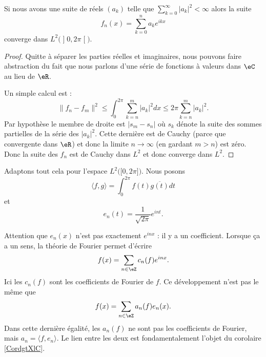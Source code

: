 \begin{proposition}
	Si nous avons une suite de réels \( (a_k)\) telle que \( \sum_{k=0}^{\infty}| a_k |^2<\infty\) alors la suite
	\begin{equation}
		f_n(x)=\sum_{k=0}^na_k e^{ikx}
	\end{equation}
	converge dans \( L^2\big( \mathopen] 0 , 2\pi \mathclose[ \big)\).
\end{proposition}

\begin{proof}
	Quitte à séparer les parties réelles et imaginaires, nous pouvons faire abstraction du fait que nous parlons d'une série de fonctions à valeurs dans \( \eC\) au lieu de \( \eR\).

	Un simple calcul est :
	\begin{equation}    \label{EqHVdJxZT}
		\| f_n-f_m \|^2\leq\int_0^{2\pi}\sum_{k=n}^m| a_k |^2dx\leq 2\pi\sum_{k=n}^m| a_k |^2.
	\end{equation}
	Par hypothèse le membre de droite est \( | s_m-s_n |\) où \( s_k\) dénote la suite des sommes partielles de la série des \( | a_k |^2\). Cette dernière est de Cauchy (parce que convergente dans \( \eR\)) et donc la limite \( n\to\infty\) (en gardant \( m>n\)) est zéro. Donc la suite des \( f_n\) est de Cauchy dans \( L^2\) et donc converge dans \( L^2\).
\end{proof}

\begin{normaltext}
	Adaptons tout cela pour l'espace \( L^2\big( \mathopen[ 0 , 2\pi \mathclose] \big)\). Nous posons
	\begin{equation}        \label{EQooBFKDooMkCZOt}
		\langle f, g\rangle =\int_0^{2\pi}f(t)\overline{ g(t) }dt
	\end{equation}
	et
	\begin{equation}        \label{EQooKMYOooLZCNap}
		e_n(t)=\frac{1}{ \sqrt{ 2\pi } } e^{int}.
	\end{equation}
\end{normaltext}

\begin{normaltext}
	Attention que \( e_n(x)\) n'est pas exactement \(  e^{inx}\) : il y a un coefficient. Lorsque ça a un sens, la théorie de Fourier permet d'écrire
	\begin{equation}
		f(x)=\sum_{n\in \eZ}c_n(f) e^{inx}.
	\end{equation}
	Ici les \( c_n(f)\) sont les coefficients de Fourier de \( f\). Ce développement n'est pas le même que
	\begin{equation}
		f(x)=\sum_{n\in \eZ}a_n(f)e_n(x).
	\end{equation}
	Dans cette dernière égalité, les \( a_n(f)\) ne sont pas les coefficients de Fourier, mais \( a_n=\langle f, e_n\rangle \). Le lien entre les deux est fondamentalement l'objet du corolaire \ref{CordgtXlC}.
\end{normaltext}


